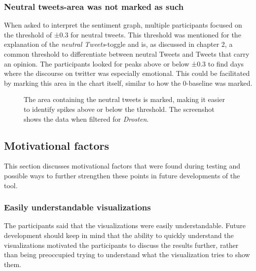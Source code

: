 \subsubsection*{Neutral tweets-area was not marked as such}
When asked to interpret the sentiment graph, multiple participants focused on the threshold of ±0.3 for neutral tweets. This threshold was mentioned for the explanation of the \emph{neutral Tweets}-toggle and is, as discussed in chapter 2, a common threshold to differentiate between neutral Tweets and Tweets that carry an opinion. The participants looked for peaks above or below ±0.3 to find days where the discourse on twitter was especially emotional. This could be facilitated by marking this area in the chart itself, similar to how the 0-baseline was marked. 

\begin{figure}[htb]
    \centering
    \caption{The area containing the neutral tweets is marked, making it easier to identify spikes above or below the threshold. The screenshot shows the data when filtered for \emph{Drosten}.}
    \label{fig:sentiment_neutral_area}
\end{figure}

\subsection{Motivational factors}
This section discusses motivational factors that were found during testing and possible ways to further strengthen these points in future developments of the tool.

\subsubsection*{Easily understandable visualizations}
The participants said that the visualizations were easily understandable. Future development should keep in mind that the ability to quickly understand the visualizations motivated the participants to discuss the results further, rather than being preoccupied trying to understand what the visualization tries to show them.

